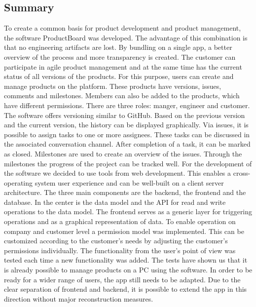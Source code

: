 \subsection*{Summary}
To create a common basis for product development and product management, the software ProductBoard was developed. The advantage of this combination is that no engineering artifacts are lost. By bundling on a single app, a better overview of the process and more transparency is created. The customer can participate in agile product management and at the same time has the current status of all versions of the products. For this purpose, users can create and manage products on the platform. These products have versions, issues, comments and milestones. Members can also be added to the products, which have different permissions. There are three roles: manger, engineer and customer. The software offers versioning similar to GitHub. Based on the previous version and the current version, the history can be displayed graphically. Via issues, it is possible to assign tasks to one or more assignees. These tasks can be discussed in the associated conversation channel. After completion of a task, it can be marked as closed. Milestones are used to create an overview of the issues. Through the milestones the progress of the project can be tracked well. For the development of the software we decided to use tools from web development. This enables a cross-operating system user experience and can be well-built on a client server architecture. The three main components are the backend, the frontend and the database. In the center is the data model and the API for read and write operations to the data model. The frontend serves as a generic layer for triggering  operations and as a graphical representation of data. To enable operation on company and customer level a permission model was implemented. This can be customized according to the customer's needs by adjusting the customer's permissions individually. The functionality from the user's point of view was tested each time a new functionality was added. The tests have shown us that it is already possible to manage products on a PC using the software. In order to be ready for a wider range of users, the app still needs to be adapted. Due to the clear separation of frontend and backend, it is possible to extend the app in this direction without major reconstruction measures. 

